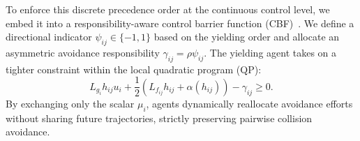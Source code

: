 To enforce this discrete precedence order at the continuous control level, we embed it into a responsibility-aware control barrier function (CBF)~\cite{cosner2023learning}. 
We define a directional indicator $\psi_{ij} \in \{-1, 1\}$ based on the yielding order and allocate an asymmetric avoidance responsibility $\gamma_{ij} = \rho \psi_{ij}$.
The yielding agent takes on a tighter constraint within the local quadratic program (QP):
\begin{equation}
    L_{g_i}h_{ij}u_i + \frac{1}{2}(L_{f_{ij}}h_{ij} + \alpha(h_{ij})) - \gamma_{ij} \ge 0.
\end{equation} 
By exchanging only the scalar $\mu_i$, agents dynamically reallocate avoidance efforts without sharing future trajectories, strictly preserving pairwise collision avoidance. 


